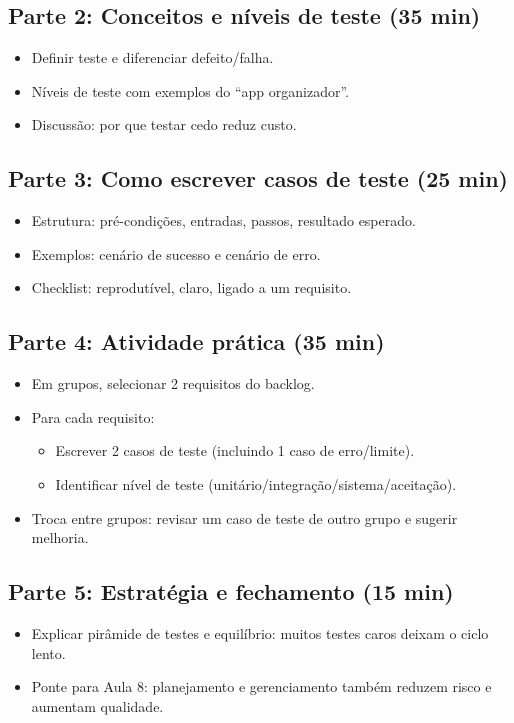 \documentclass[12pt,a4paper]{article}
\begin{document}
\subsection*{Parte 2: Conceitos e níveis de teste (35 min)}
\begin{itemize}[leftmargin=*,itemsep=0.35em]
  \item Definir teste e diferenciar defeito/falha.
  \item Níveis de teste com exemplos do ``app organizador''.
  \item Discussão: por que testar cedo reduz custo.
\end{itemize}

\subsection*{Parte 3: Como escrever casos de teste (25 min)}
\begin{itemize}[leftmargin=*,itemsep=0.35em]
  \item Estrutura: pré-condições, entradas, passos, resultado esperado.
  \item Exemplos: cenário de sucesso e cenário de erro.
  \item Checklist: reprodutível, claro, ligado a um requisito.
\end{itemize}

\subsection*{Parte 4: Atividade prática (35 min)}
\begin{itemize}[leftmargin=*,itemsep=0.35em]
  \item Em grupos, selecionar 2 requisitos do backlog.
  \item Para cada requisito:
  \begin{itemize}[leftmargin=*,itemsep=0.25em]
    \item Escrever 2 casos de teste (incluindo 1 caso de erro/limite).
    \item Identificar nível de teste (unitário/integração/sistema/aceitação).
  \end{itemize}
  \item Troca entre grupos: revisar um caso de teste de outro grupo e sugerir melhoria.
\end{itemize}

\subsection*{Parte 5: Estratégia e fechamento (15 min)}
\begin{itemize}[leftmargin=*,itemsep=0.35em]
  \item Explicar pirâmide de testes e equilíbrio: muitos testes caros deixam o ciclo lento.
  \item Ponte para Aula 8: planejamento e gerenciamento também reduzem risco e aumentam qualidade.
\end{itemize}
\end{document}
